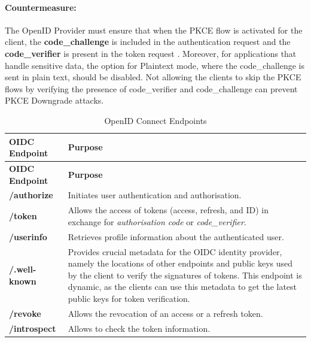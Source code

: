     \paragraph{Countermeasure:} The OpenID Provider must ensure that when the PKCE flow is activated for the client, the \textbf{code\_challenge} is included in the authentication request and the \textbf{code\_verifier} is present in the token request \citep{oidc_attacks}. Moreover, for applications that handle sensitive data, the option for Plaintext mode, where the code\_challenge is sent in plain text, should be disabled. Not allowing the clients to skip the PKCE flows by verifying the presence of code\_verifier and code\_challenge can prevent PKCE Downgrade attacks. \newline


    
    
    \begin{longtable}{|>{\raggedright\arraybackslash}p{4cm}|>{\raggedright\arraybackslash}p{11cm}|}
    \caption{OpenID Connect Endpoints}
    \label{table:outh_endpoints}
    \hline
    \rowcolor{grey!15}
    \textbf{OIDC Endpoint} & \textbf{Purpose} \\ \hline
    \endfirsthead
    \hline
    \rowcolor{grey!15}
    \textbf{OIDC Endpoint} & \textbf{Purpose} \\ \hline
    \endhead
    \hline 
    \endfoot
    \hline
    \endlastfoot
   \textbf{/authorize} & Initiates user authentication and authorisation. \\ \hline

    \textbf{/token} & Allows the access of tokens (access, refresh, and ID) in exchange for \textit{authorisation code} or \textit{code\_verifier}.\\ \hline
    
    \textbf{/userinfo} & Retrieves profile information about the authenticated user. \\ \hline
    
    \textbf{/.well-known} & Provides crucial metadata for the OIDC identity provider, namely the locations of other endpoints and public keys used by the client to verify the signatures of tokens. This endpoint is dynamic, as the clients can use this metadata to get the latest public keys for token verification. \\ \hline
    
    \textbf{/revoke} & Allows the revocation of an access or a refresh token. \\ \hline

    \textbf{/introspect} & Allows to check the token information. \\ \hline
        
    \end{longtable}
    





